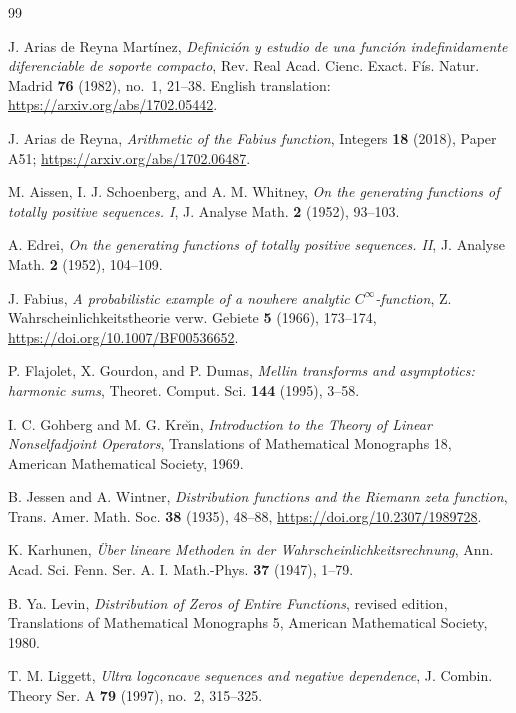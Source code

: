 \documentclass[11pt,oneside]{article}
\theoremstyle{definition}
\begin{document}
\begin{thebibliography}{99}

J. Arias de Reyna Mart\'inez,
\emph{Definici\'on y estudio de una funci\'on indefinidamente diferenciable de soporte compacto},
Rev. Real Acad. Cienc. Exact. F\'is. Natur. Madrid \textbf{76} (1982), no.~1, 21--38.
English translation: \url{https://arxiv.org/abs/1702.05442}.

J. Arias de Reyna,
\emph{Arithmetic of the Fabius function},
Integers \textbf{18} (2018), Paper A51;
\url{https://arxiv.org/abs/1702.06487}.

M. Aissen, I. J. Schoenberg, and A. M. Whitney,
\emph{On the generating functions of totally positive sequences. I},
J. Analyse Math. \textbf{2} (1952), 93--103.

A. Edrei,
\emph{On the generating functions of totally positive sequences. II},
J. Analyse Math. \textbf{2} (1952), 104--109.

J. Fabius,
\emph{A probabilistic example of a nowhere analytic \(C^\infty\)-function},
Z. Wahrscheinlichkeitstheorie verw. Gebiete \textbf{5} (1966), 173--174,
\url{https://doi.org/10.1007/BF00536652}.

P. Flajolet, X. Gourdon, and P. Dumas,
\emph{Mellin transforms and asymptotics: harmonic sums},
Theoret. Comput. Sci. \textbf{144} (1995), 3--58.

I. C. Gohberg and M. G. Kre\u\i n,
\emph{Introduction to the Theory of Linear Nonselfadjoint Operators},
Translations of Mathematical Monographs 18, American Mathematical Society, 1969.

B. Jessen and A. Wintner,
\emph{Distribution functions and the Riemann zeta function},
Trans. Amer. Math. Soc. \textbf{38} (1935), 48--88,
\url{https://doi.org/10.2307/1989728}.

K. Karhunen,
\emph{\"Uber lineare Methoden in der Wahrscheinlichkeitsrechnung},
Ann. Acad. Sci. Fenn. Ser. A. I. Math.-Phys. \textbf{37} (1947), 1--79.

B. Ya. Levin,
\emph{Distribution of Zeros of Entire Functions},
revised edition, Translations of Mathematical Monographs 5, American Mathematical
Society, 1980.

T. M. Liggett,
\emph{Ultra logconcave sequences and negative dependence},
J. Combin. Theory Ser. A \textbf{79} (1997), no.~2, 315--325.


\end{thebibliography}
\end{document}
